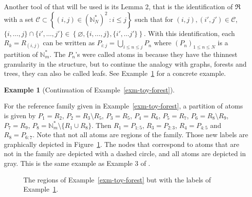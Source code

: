 \documentclass[
  11pt,
  a4paper,
]{article}
\theoremstyle{plain}
\theoremstyle{definition}
\newtheorem{example}{Example}[section]
\theoremstyle{plain}
\theoremstyle{definition}
\theoremstyle{plain}
\theoremstyle{remark}
\begin{document}
Another tool of \citet{MR4178188} that will be used is its Lemma 2, that
is the identification of \(\mathfrak{R}\) with a set
\(\mathcal C\subset \left\{(i,j)\in \left(\mathbb N_N^*\right)^2 \: : i\leq j\right\}\)
such that for \((i,j), (i',j')\in\mathcal C\),
\(\{i,\dotsc, j\}\cap\{i',\dotsc,j'\}\in\left\{\varnothing, \{i,\dotsc, j\},\{i',\dotsc j'\}  \right\}\).
With this identification, each \(R_k=R_{(i,j)}\) can be written as
\(P_{i:j}=\bigcup_{i\leq n\leq j}P_n\) where \((P_n)_{1\leq n \leq N}\)
is a partition of \(\mathbb{N}_m^*\). The \(P_n\)'s were called atoms in
\citet{MR4178188} because they have the thinnest granularity in the
structure, but to continue the analogy with graphs, forests and trees,
they can also be called leafs. See Example~\ref{exm-toy-leaves} for a
concrete example.

\begin{example}[Continuation of
Example~\ref{exm-toy-forest}]\protect\hypertarget{exm-toy-leaves}{}\label{exm-toy-leaves}

For the reference family given in Example~\ref{exm-toy-forest}, a
partition of atoms is given by \(P_1 =R_2\),
\(P_2  =   R_3\setminus R_5\), \(P_3  =   R_5\), \(P_4=R_6\),
\(P_5=R_7\), \(P_6=R_8\setminus R_9\), \(P_7=R_9\),
\(P_8=\mathbb{N}_m^* \setminus \{R_1 \cup R_8 \}\). Then
\(R_1=P_{1:5}\), \(R_3=P_{2:3}\), \(R_4=P_{4:5}\) and \(R_8=P_{6:7}\).
Note that not all atoms are regions of the family. Those new labels are
graphically depicted in Figure~\ref{fig-leaves-exm}. The nodes that
correspond to atoms that are not in the family are depicted with a
dashed circle, and all atoms are depicted in gray. This is the same
example as Example 3 of \citet{MR4178188}.

\end{example}

\begin{figure}


\caption{\label{fig-leaves-exm}The regions of
Example~\ref{exm-toy-forest} but with the labels of
Example~\ref{exm-toy-leaves}.}

\end{figure}%
\end{document}
